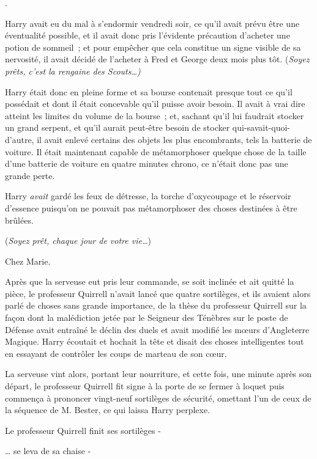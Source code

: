 
.

\hplettrineextrapara
Harry avait eu du mal à s'endormir vendredi soir, ce qu'il avait prévu être une éventualité possible, et il avait donc pris l'évidente précaution d'acheter une potion de sommeil~; et pour empêcher que cela constitue un signe visible de sa nervosité, il avait décidé de l'acheter à Fred et George deux mois plus tôt. (\emph{Soyez prêts, c'est la rengaine des Scouts…)}

Harry était donc en pleine forme et sa bourse contenait presque tout ce qu'il possédait et dont il était concevable qu'il puisse avoir besoin. Il avait à vrai dire atteint les limites du volume de la bourse~; et, sachant qu'il lui faudrait stocker un grand serpent, et qu'il aurait peut-être besoin de stocker qui-savait-quoi-d'autre, il avait enlevé certains des objets les plus encombrants, tels la batterie de voiture. Il était maintenant capable de métamorphoser quelque chose de la taille d'une batterie de voiture en quatre minutes chrono, ce n'était donc pas une grande perte.

Harry \emph{avait} gardé les feux de détresse, la torche d'oxycoupage et le réservoir d'essence puisqu'on ne pouvait pas métamorphoser des choses destinées à être brûlées.

(\emph{Soyez prêt, chaque jour de votre vie…})

Chez Marie.

Après que la serveuse eut pris leur commande, se soit inclinée et ait quitté la pièce, le professeur Quirrell n'avait lancé que quatre sortilèges, et ils avaient alors parlé de choses sans grande importance, de la thèse du professeur Quirrell sur la façon dont la malédiction jetée par le Seigneur des Ténèbres sur le poste de Défense avait entraîné le déclin des duels et avait modifié les mœurs d'Angleterre Magique. Harry écoutait et hochait la tête et disait des choses intelligentes tout en essayant de contrôler les coups de marteau de son cœur.

La serveuse vint alors, portant leur nourriture, et cette fois, une minute après son départ, le professeur Quirrell fit signe à la porte de se fermer à loquet puis commença à prononcer vingt-neuf sortilèges de sécurité, omettant l'un de ceux de la séquence de M. Bester, ce qui laissa Harry perplexe.

Le professeur Quirrell finit ses sortilèges -

… se leva de sa chaise -

